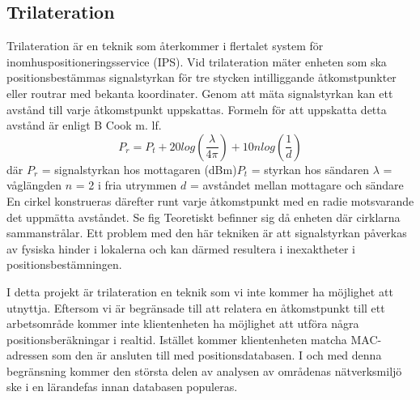 \documentclass[swedish, a4paper,12pt]{article}
\begin{document}
\subsection{Trilateration}
Trilateration är en teknik som återkommer i flertalet system för inomhuspositioneringsservice (IPS). Vid trilateration mäter enheten som ska positionsbestämmas signalstyrkan för tre stycken intilliggande åtkomstpunkter eller routrar med bekanta koordinater. Genom att mäta signalstyrkan kan ett avstånd till varje åtkomstpunkt uppskattas. Formeln för att uppskatta detta avstånd är enligt B Cook m. lf.\cite{cook2005indoor}
\newline
$$ P_r = P_t + 20log(\frac{\lambda}{4\pi}) + 10nlog(\frac{1}{d})$$
där
$  P_r $ = signalstyrkan hos mottagaren (dBm)\newline $P_t$ = styrkan hos sändaren\newline
$\lambda$ = våglängden\newline
$ n $ = 2 i fria utrymmen\newline
$ d $ = avståndet mellan mottagare och sändare
\bigskip
\newline
En cirkel konstrueras därefter runt varje åtkomstpunkt med en radie motsvarande det uppmätta avståndet. Se fig %
Teoretiskt befinner sig då enheten där cirklarna sammanstrålar. Ett problem med den här tekniken är att signalstyrkan påverkas av fysiska hinder i lokalerna och kan därmed resultera i inexaktheter i positionsbestämningen.

I detta projekt är trilateration en teknik som vi inte kommer ha möjlighet att utnyttja. Eftersom vi är begränsade till att relatera en åtkomstpunkt till ett arbetsområde kommer inte klientenheten ha möjlighet att utföra några positionsberäkningar i realtid. Istället kommer klientenheten matcha MAC-adressen som den är ansluten till med positionsdatabasen. I och med denna begränsning kommer den största delen av analysen av områdenas nätverksmiljö ske i en lärandefas innan databasen populeras.
\end{document}
